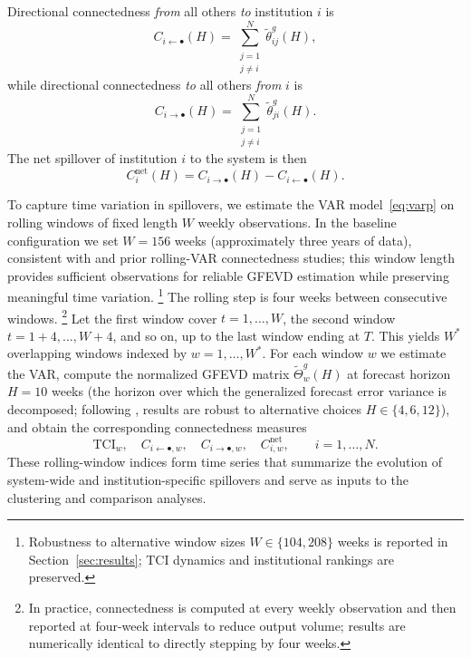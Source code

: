 Directional connectedness \emph{from} all others \emph{to} institution $i$ is
\begin{equation}
  C_{i \leftarrow \bullet}(H)
  = \sum_{\substack{j=1 \\ j \neq i}}^N \tilde{\theta}_{ij}^g(H),
\end{equation}
while directional connectedness \emph{to} all others \emph{from} $i$ is
\begin{equation}
  C_{i \rightarrow \bullet}(H)
  = \sum_{\substack{j=1 \\ j \neq i}}^N \tilde{\theta}_{ji}^g(H).
\end{equation}
The net spillover of institution $i$ to the system is then
\begin{equation}
  C_i^{\text{net}}(H)
  = C_{i \rightarrow \bullet}(H) - C_{i \leftarrow \bullet}(H).
\end{equation}

To capture time variation in spillovers, we estimate the VAR model~\eqref{eq:varp} on
rolling windows of fixed length $W$ weekly observations. In the baseline configuration we
set $W = 156$ weeks (approximately three years of data), consistent with \citet{DieboldYilmaz2014}
and prior rolling-VAR connectedness studies; this window length provides sufficient
observations for reliable GFEVD estimation while preserving meaningful time variation.%
\footnote{Robustness to alternative window sizes $W \in \{104, 208\}$ weeks is reported
in Section~\ref{sec:results}; TCI dynamics and institutional rankings are preserved.}
The rolling step is four weeks between consecutive windows.%
\footnote{In practice, connectedness is computed at every weekly observation and then
reported at four-week intervals to reduce output volume; results are numerically identical
to directly stepping by four weeks.}
Let the first window cover $t = 1,\dots,W$, the second window $t = 1+4,\dots,W+4$, and
so on, up to the last window ending at $T$. This yields $W^\ast$ overlapping windows
indexed by $w = 1,\dots,W^\ast$. For each window $w$ we estimate the VAR, compute the
normalized GFEVD matrix $\tilde{\Theta}^g_w(H)$ at forecast horizon $H = 10$ weeks (the
horizon over which the generalized forecast error variance is decomposed; following
\citet{DieboldYilmaz2012}, results are robust to alternative choices $H \in \{4,6,12\}$),
and obtain the corresponding connectedness measures
\[
  \mathrm{TCI}_w,\quad
  C_{i \leftarrow \bullet, w},\quad
  C_{i \rightarrow \bullet, w},\quad
  C_{i,w}^{\text{net}},\qquad i = 1,\dots,N.
\]
These rolling-window indices form time series that summarize the evolution of system-wide
and institution-specific spillovers and serve as inputs to the clustering and comparison
analyses.

